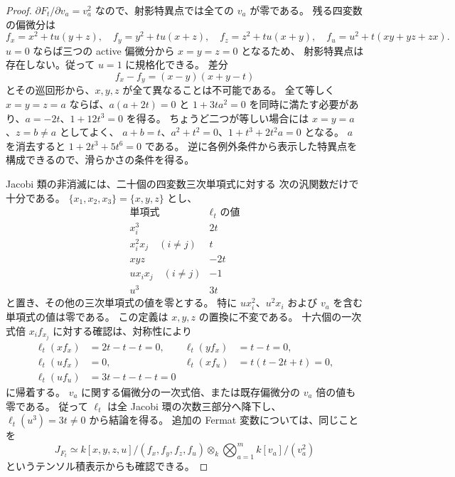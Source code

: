 \begin{proof}
$\partial F_t/\partial v_a=v_a^2$ なので、射影特異点では全ての $v_a$ が零である。
残る四変数の偏微分は
\[
 f_x=x^2+tu(y+z),\quad f_y=y^2+tu(x+z),\quad
 f_z=z^2+tu(x+y),\quad f_u=u^2+t(xy+yz+zx).
\]
$u=0$ ならば三つの active 偏微分から $x=y=z=0$ となるため、
射影特異点は存在しない。従って $u=1$ に規格化できる。
差分
\[
 f_x-f_y=(x-y)(x+y-t)
\]
とその巡回形から、$x,y,z$ が全て異なることは不可能である。
全て等しく $x=y=z=a$ ならば、$a(a+2t)=0$ と
$1+3ta^2=0$ を同時に満たす必要があり、$a=-2t$、$1+12t^3=0$ を得る。
ちょうど二つが等しい場合には $x=y=a$、$z=b\ne a$ としてよく、
$a+b=t$、$a^2+t^2=0$、$1+t^3+2t^2a=0$ となる。
$a$ を消去すると $1+2t^3+5t^6=0$ である。
逆に各例外条件から表示した特異点を構成できるので、滑らかさの条件を得る。

Jacobi 類の非消滅には、二十個の四変数三次単項式に対する
次の汎関数だけで十分である。
$\{x_1,x_2,x_3\}=\{x,y,z\}$ とし、
\begin{equation}\label{eq:trace-jacobi-functional}
 \begin{array}{c|c}
 \text{単項式}&\ell_t\text{ の値}\\ \hline
 x_i^3&2t\\
 x_i^2x_j\quad(i\ne j)&t\\
 xyz&-2t\\
 ux_ix_j\quad(i\ne j)&-1\\
 u^3&3t
 \end{array}
\end{equation}
と置き、その他の三次単項式の値を零とする。
特に $ux_i^2$、$u^2x_i$ および $v_a$ を含む単項式の値は零である。
この定義は $x,y,z$ の置換に不変である。
十六個の一次式倍 $x_i f_{x_j}$ に対する確認は、対称性により
\[
 \begin{aligned}
 \ell_t(xf_x)&=2t-t-t=0,&
 \ell_t(yf_x)&=t-t=0,\\
 \ell_t(uf_x)&=0,&
 \ell_t(xf_u)&=t(t-2t+t)=0,\\
 \ell_t(uf_u)&=3t-t-t-t=0
 \end{aligned}
\]
に帰着する。
$v_a$ に関する偏微分の一次式倍、または既存偏微分の $v_a$ 倍の値も零である。
従って $\ell_t$ は全 Jacobi 環の次数三部分へ降下し、
$\ell_t(u^3)=3t\ne0$ から結論を得る。
追加の Fermat 変数については、同じことを
\[
 J_{F_t}\simeq
 k[x,y,z,u]/(f_x,f_y,f_z,f_u)
 \otimes_k\bigotimes_{a=1}^{m}k[v_a]/(v_a^2)
\]
というテンソル積表示からも確認できる。
\end{proof}


